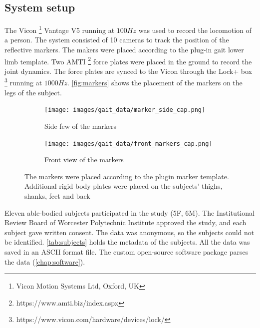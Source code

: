 \subsection{System setup}

The Vicon \footnote{Vicon Motion Systems Ltd, Oxford, UK}  Vantage V5 running at $100Hz$ was used to record the locomotion of a person. The system consisted of 10 cameras to track the position of the reflective markers. The makers were placed according to the plug-in gait lower limb template. Two AMTI \footnote{https://www.amti.biz/index.aspx} force plates were placed in the ground to record the joint dynamics. The force plates are synced to the Vicon through the Lock+ box \footnote{https://www.vicon.com/hardware/devices/lock/} running at $1000Hz$. \autoref{fig:markers} shows the placement of the markers on the legs of the subject. 



\begin{figure}
\centering 
\begin{subfigure}{0.4\linewidth} 
  \centering 
  \texttt{[image: images/gait\_data/marker\_side\_cap.png]} 
  \caption[Side Marker Placement]{Side few of the markers} 
  \label{fig:markers_side} 
\end{subfigure} 
%
\begin{subfigure}{0.4\linewidth} 
  \centering 
  \texttt{[image: images/gait\_data/front\_markers\_cap.png]} 
  \caption[Front Marker Placement]{Front view of the markers} 
  \label{fig:markers_front} 
\end{subfigure} 
\caption[Marker Placement]{The markers were placed according to the plugin marker template. Additional rigid body plates were placed on the subjects' thighs, shanks, feet and back} 
\label{fig:markers} 

\end{figure} 


Eleven able-bodied subjects participated in the study (5F, 6M). The Institutional Review Board of Worcester Polytechnic Institute approved the study, and each subject gave written consent. The data was anonymous, so the subjects could not be identified. \autoref{tab:subjects} holds the metadata of the subjects. All the data was saved in an ASCII format file. The custom open-source software package parses the data (\autoref{chap:software}).

